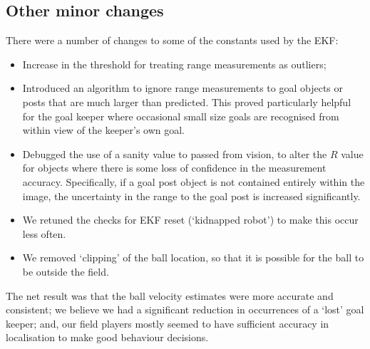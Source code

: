 \subsection{Other minor changes}
\label{locwm:other}
There were a number of changes to some of the constants used by the
EKF:
\begin{itemize}
  \item {Increase in the threshold for treating range measurements as outliers;}
  \item {Introduced an algorithm to ignore range measurements to goal objects or posts that are much
  larger than predicted. This proved particularly helpful for the
  goal keeper where occasional small size goals are recognised from
  within view of the keeper's own goal.}
  \item {Debugged the use of a sanity value to passed from vision, to alter the $R$ value for
  objects where there is some loss of confidence in the measurement accuracy. Specifically, if a goal
  post object is not contained entirely within the image, the uncertainty in the range to the goal post
  is increased significantly.}
  \item {We retuned the checks for EKF reset (`kidnapped robot') to make this occur less often.}
  \item {We removed `clipping' of the ball location, so that it is possible for the ball to be outside
  the field.}
\end{itemize}

The net result was that the ball velocity estimates were more
accurate and consistent; we believe we had a significant reduction
in occurrences of a `lost' goal keeper; and, our field players
mostly seemed to have sufficient accuracy in localisation to make
good behaviour decisions.
